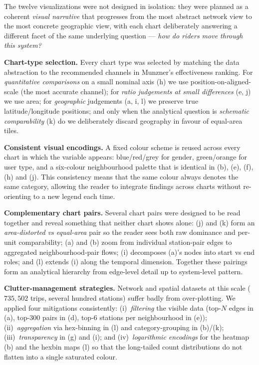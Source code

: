 \documentclass[11pt, a4paper]{article}
\begin{document}
The twelve visualizations were not designed in isolation: they were planned as a coherent \emph{visual narrative} that progresses from the most abstract network view to the most concrete geographic view, with each chart deliberately answering a different facet of the same underlying question --- \emph{how do riders move through this system?}

\textbf{Chart-type selection.} Every chart type was selected by matching the data abstraction to the recommended channels in Munzner's effectiveness ranking. For \emph{quantitative comparisons} on a small nominal axis (h) we use position-on-aligned-scale (the most accurate channel); for \emph{ratio judgements at small differences} (e, j) we use area; for \emph{geographic} judgements (a, i, l) we preserve true latitude/longitude positions; and only when the analytical question is \emph{schematic comparability} (k) do we deliberately discard geography in favour of equal-area tiles.

\textbf{Consistent visual encodings.} A fixed colour scheme is reused across every chart in which the variable appears: blue/red/grey for gender, green/orange for user type, and a six-colour neighbourhood palette that is identical in (b), (e), (f), (h) and (j). This consistency means that the same colour always denotes the same category, allowing the reader to integrate findings across charts without re-orienting to a new legend each time.

\textbf{Complementary chart pairs.} Several chart pairs were designed to be read together and reveal something that neither chart shows alone: (j) and (k) form an \emph{area-distorted vs equal-area} pair so the reader sees both raw dominance and per-unit comparability; (a) and (b) zoom from individual station-pair edges to aggregated neighbourhood-pair flows; (i) decomposes (a)'s nodes into start vs end roles; and (l) extends (i) along the temporal dimension. Together these pairings form an analytical hierarchy from edge-level detail up to system-level pattern.

\textbf{Clutter-management strategies.} Network and spatial datasets at this scale (\,$735{,}502$ trips, several hundred stations) suffer badly from over-plotting. We applied four mitigations consistently: (i)~\emph{filtering} the visible data (top-$N$ edges in (a), top-300 pairs in (d), top-6 stations per neighbourhood in (e)); (ii)~\emph{aggregation} via hex-binning in (l) and category-grouping in (b)/(k); (iii)~\emph{transparency} in (g) and (i); and (iv)~\emph{logarithmic encodings} for the heatmap (b) and the hexbin maps (l) so that the long-tailed count distributions do not flatten into a single saturated colour.
\end{document}
